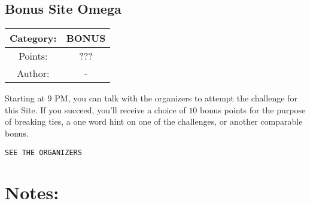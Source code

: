 \begin{center}
\section*{Bonus Site Omega}
{\large
\begin{tabular}{| c c |}
\hline
Category: & BONUS\\\hline
Points: & ???\\\hline
Author: & -\\\hline
\end{tabular}
}
\end{center}
\vspace{0.5in}

{\large
Starting at 9 PM, you can talk with the organizers to attempt the challenge for this Site. If you succeed, you'll receive a choice of $10$ bonus points for the purpose of breaking ties, a one word hint on one of the challenges, or another comparable bonus.
}
\vspace{0.25in}
\begin{center}
  {\Large\tt SEE THE ORGANIZERS}
\end{center}

\vspace{0.25in}
\section*{Notes:}
